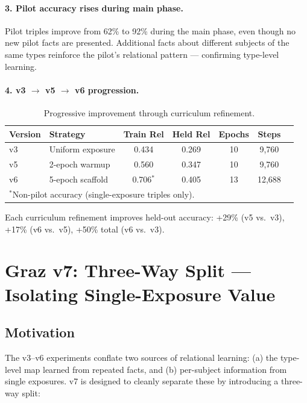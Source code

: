 \documentclass[11pt]{article}
\begin{document}
\paragraph{3. Pilot accuracy rises during main phase.}
Pilot triples improve from 62\% to 92\% during the main phase, even though no new
pilot facts are presented.  Additional facts about different subjects of the same
types reinforce the pilot's relational pattern --- confirming type-level learning.

\paragraph{4. v3 $\to$ v5 $\to$ v6 progression.}

\begin{table}[h]
\centering
\caption{Progressive improvement through curriculum refinement.}
\begin{tabular}{llccccc}
\toprule
Version & Strategy & Train Rel & Held Rel & Epochs & Steps \\
\midrule
v3 & Uniform exposure & 0.434 & 0.269 & 10 & 9,760 \\
v5 & 2-epoch warmup & 0.560 & 0.347 & 10 & 9,760 \\
v6 & 5-epoch scaffold & 0.706$^*$ & 0.405 & 13 & 12,688 \\
\bottomrule
\multicolumn{6}{l}{\small $^*$Non-pilot accuracy (single-exposure triples only).}
\end{tabular}
\end{table}

Each curriculum refinement improves held-out accuracy: +29\% (v5 vs.\ v3), +17\%
(v6 vs.\ v5), +50\% total (v6 vs.\ v3).

\section{Graz v7: Three-Way Split --- Isolating Single-Exposure Value}
\label{sec:v7}

\subsection{Motivation}

The v3--v6 experiments conflate two sources of relational learning: (a) the type-level
map learned from repeated facts, and (b) per-subject information from single exposures.
v7 is designed to cleanly separate these by introducing a three-way split:
\end{document}

